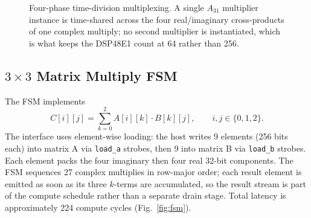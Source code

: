\documentclass[conference]{IEEEtran}
\begin{document}
\begin{figure}[t]
\caption{Four-phase time-division multiplexing. A single $A_{31}$ multiplier
instance is time-shared across the four real/imaginary cross-products of one
complex multiply; no second multiplier is instantiated, which is what keeps the
DSP48E1 count at 64 rather than 256.}
\label{fig:tdm}
\end{figure}

\subsection{$3\times3$ Matrix Multiply FSM}

The FSM implements
\begin{equation}
C[i][j] = \sum_{k=0}^{2} A[i][k]\cdot B[k][j], \qquad i,j \in \{0,1,2\}.
\end{equation}
The interface uses element-wise loading: the host writes 9 elements
(256 bits each) into matrix A via \texttt{load\_a} strobes, then 9 into
matrix B via \texttt{load\_b} strobes. Each element packs the four
imaginary then four real 32-bit components. The FSM sequences 27 complex
multiplies in row-major order; each result element is emitted as soon as
its three $k$-terms are accumulated, so the result stream is part of the
compute schedule rather than a separate drain stage. Total latency is
approximately 224 compute cycles (Fig.~\ref{fig:fsm}).
\end{document}
